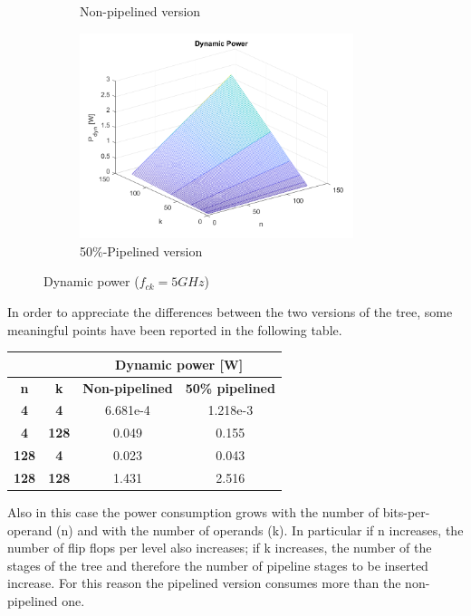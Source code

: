 \begin{figure}[H]
{\begin{subfigure}{0.55\textwidth}
			\caption{Non-pipelined version}
		\end{subfigure}
		\begin{subfigure}{0.55\textwidth}
			\includegraphics[width=8cm]{immagini/radix2ppipe2/p_dyn3D.png}
			\caption{50\%-Pipelined version}
		\end{subfigure}
	}
	\caption{Dynamic power ($f_{ck}=5 GHz$)}
	\label{fig:pdyn}
\end{figure}

In order to appreciate the differences between the two versions of the tree, some meaningful points have been reported in the following table.
\begin{center}
	\begin{tabular}{cc|c|c|}
		\cline{3-4}
		\multicolumn{1}{l}{}               & \multicolumn{1}{l|}{} & \multicolumn{2}{c|}{\textbf{Dynamic power {[}W{]}}} \\ \hline
		\multicolumn{1}{|c|}{\textbf{n}}   & \textbf{k}            & \textbf{Non-pipelined}   & \textbf{50\% pipelined}  \\ \hline
		\multicolumn{1}{|c|}{\textbf{4}}   & \textbf{4}            & 6.681e-4                 & 1.218e-3                 \\ \hline
		\multicolumn{1}{|c|}{\textbf{4}}   & \textbf{128}          & 0.049                    & 0.155                    \\ \hline
		\multicolumn{1}{|c|}{\textbf{128}} & \textbf{4}            & 0.023                    & 0.043                    \\ \hline
		\multicolumn{1}{|c|}{\textbf{128}} & \textbf{128}          & 1.431                    & 2.516                    \\ \hline
	\end{tabular}
\end{center}

Also in this case the power consumption grows with the number of bits-per-operand (n) and with the number of operands (k). 
In particular if n increases, the number of flip flops per level also increases; if k increases, the number of the stages of the tree and therefore the number of pipeline stages to be inserted increase. For this reason the pipelined version consumes more than the non-pipelined one.

